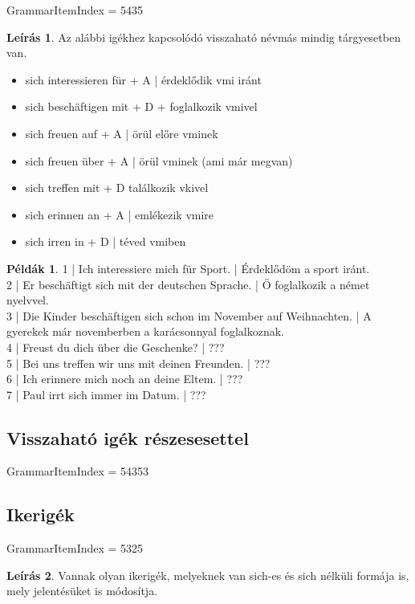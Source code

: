 \documentclass{article}
\theoremstyle{definition}
\newtheorem*{exmp}{Példák}
\newtheorem*{desc}{Leírás}
\begin{document}
GrammarItemIndex = 5435

\begin{desc}
Az alábbi igékhez kapcsolódó visszaható névmás mindig tárgyesetben van.

\begin{itemize}
\item sich interessieren für + A | érdeklődik vmi iránt
\item sich beschäftigen mit + D + foglalkozik vmivel
\item sich freuen auf + A | örül előre vminek
\item sich freuen über + A | örül vminek (ami már megvan)
\item sich treffen mit + D  találkozik vkivel
\item sich erinnen an + A | emlékezik vmire
\item sich irren in + D | téved vmiben
\end{itemize}
\end{desc}

\begin{exmp}
1 | Ich interessiere mich für Sport. | Érdeklődöm a sport iránt.\\
2 | Er beschäftigt sich mit der deutschen Sprache. | Ő foglalkozik a német nyelvvel.\\
3 | Die Kinder beschäftigen sich schon im November auf Weihnachten. | A gyerekek már novemberben a karácsonnyal foglalkoznak.\\
4 | Freust du dich über die Geschenke? | ???\\
5 | Bei uns treffen wir uns mit deinen Freunden. | ???\\
6 | Ich erinnere mich noch an deine Eltem. | ???\\
7 | Paul irrt sich immer im Datum. | ???\\
\end{exmp}

\subsection{Visszaható igék részesesettel}

GrammarItemIndex = 54353

\subsection{Ikerigék}

GrammarItemIndex = 5325

\begin{desc}
Vannak olyan ikerigék, melyeknek van sich-es és sich nélküli
formája is, mely jelentésüket is módosítja.
\end{desc}
\end{document}
